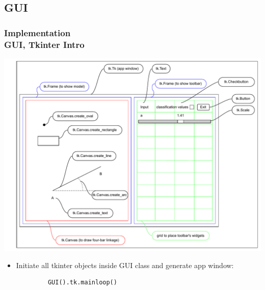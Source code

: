 \documentclass[ucs,10pt]{beamer}
\begin{document}
\subsection{GUI}

\begin{frame}[fragile]
\frametitle{Implementation \\
	\small \color{rwth-blue} GUI, Tkinter Intro}
	\begin{center}
		\vspace*{-1mm}
		\includegraphics[width=0.78\linewidth]{./Figures/Implementation/GUI/tkinter_grid.pdf}
		\begin{itemize}
			\item Initiate all tkinter objects inside GUI class and generate app window:
		\end{itemize}
		\begin{lstlisting}
			GUI().tk.mainloop()
		\end{lstlisting}
	\end{center}
\end{frame}
\end{document}

